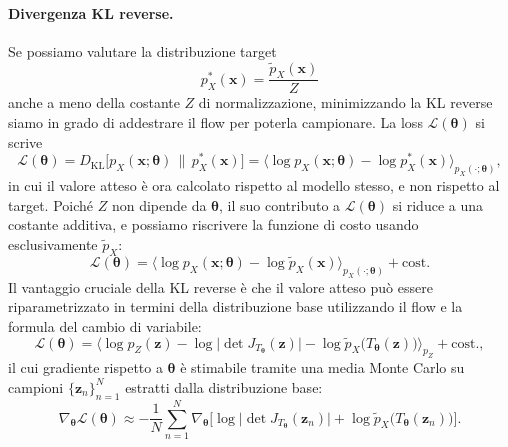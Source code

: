 \paragraph{Divergenza KL reverse.} Se possiamo valutare la distribuzione target
\begin{equation}
   p_X^*(\mathbf{x}) = \frac{\tilde{p}_X(\mathbf{x})}{Z} 
\end{equation}
anche a meno della costante $Z$ di normalizzazione, minimizzando la KL reverse siamo in grado di addestrare il flow per poterla campionare.  La loss $\mathcal{L}(\boldsymbol{\theta})$ si scrive
\begin{equation}
    \mathcal{L}(\boldsymbol{\theta}) = D_{\mathrm{KL}}\big[p_X(\mathbf{x};\boldsymbol{\theta}) \,\|\, p_X^*(\mathbf{x})\big] = \big\langle \log p_X(\mathbf{x};\boldsymbol{\theta}) - \log p_X^*(\mathbf{x}) \big\rangle_{p_X(\cdot;\boldsymbol{\theta})},
\end{equation}
in cui il valore atteso è ora calcolato rispetto al modello stesso, e non rispetto al target. Poiché $Z$ non dipende da $\boldsymbol{\theta}$, il suo contributo a $\mathcal{L}(\boldsymbol{\theta})$ si riduce a una costante additiva, e possiamo riscrivere la funzione di costo usando esclusivamente $\tilde{p}_X$:
\begin{equation}
    \mathcal{L}(\boldsymbol{\theta}) = \big\langle \log p_X(\mathbf{x};\boldsymbol{\theta}) - \log \tilde{p}_X(\mathbf{x}) \big\rangle_{p_X(\cdot;\boldsymbol{\theta})} + \mathrm{cost.}
\end{equation}
Il vantaggio cruciale della KL reverse è che il valore atteso può essere riparametrizzato in termini della distribuzione base utilizzando il flow e la formula del cambio di variabile:
\begin{equation}
    \mathcal{L}(\boldsymbol{\theta}) = \Big\langle \log p_Z(\mathbf{z}) - \log \big|\det J_{T_{\boldsymbol{\theta}}}(\mathbf{z})\big| - \log \tilde{p}_X\big(T_{\boldsymbol{\theta}}(\mathbf{z})\big) \Big\rangle_{p_Z} + \mathrm{cost.},
\end{equation}
il cui gradiente rispetto a $\boldsymbol{\theta}$ è stimabile tramite una media Monte Carlo su campioni $\{\mathbf{z}_n\}_{n=1}^N$ estratti dalla distribuzione base:
\begin{equation}
    \nabla_{\boldsymbol{\theta}} \mathcal{L}(\boldsymbol{\theta}) \approx - \frac{1}{N} \sum_{n=1}^{N} \nabla_{\boldsymbol{\theta}} \Big[  \log \big|\det J_{T_{\boldsymbol{\theta}}}(\mathbf{z}_n)\big| + \log \tilde{p}_X\big(T_{\boldsymbol{\theta}}(\mathbf{z}_n)\big) \Big].
\end{equation}

